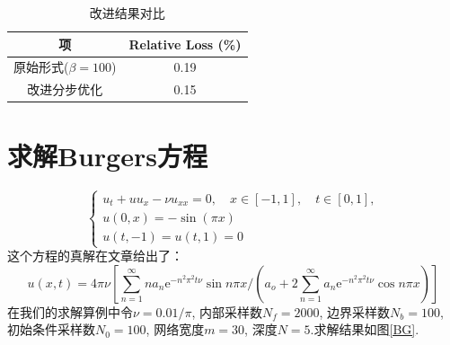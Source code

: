 \documentclass{article}
\begin{document}
\begin{table}[ht]
\centering  
\caption{改进结果对比}
\label{改进 vs 不改进}
\begin{tabular}{cc} 
	\toprule
	项 & Relative Loss (\%) \\
	\hline
	\hline
	原始形式($\beta=100$) & 0.19 \\
	\hline
	改进分步优化 & 0.15 \\
	\bottomrule
\end{tabular}
\end{table}

\section{求解Burgers方程}
\begin{equation}\label{burgers}
	\begin{cases}
 		u_{t}+u u_{x}-\nu u_{x x}=0, \quad x \in[-1,1], \quad t \in[0,1], \\
		u(0, x)=-\sin (\pi x) \\
		u(t,-1)=u(t, 1)=0
 	\end{cases}
\end{equation}
这个方程的真解在文章\cite{spectral}给出了：
$$
u(x, t)=4 \pi \nu\left[\sum_{n=1}^{\infty} n a_{n} \mathrm{e}^{-n^{2} \pi^{2} t \nu} \sin n \pi x \Big/\left(a_{o}+2 \sum_{n=1}^{\infty} a_{n} \mathrm{e}^{-n^{2} \pi^{2} t \nu} \cos n \pi x\right)\right]
$$
在我们的求解算例中令$\nu = 0.01 / \pi$, 内部采样数$N_f = 2000$, 边界采样数$N_b = 100$, 初始条件采样数$N_0 = 100$,
网络宽度$m = 30$, 深度$N=5$.求解结果如图\ref{BG}.
\end{document}

